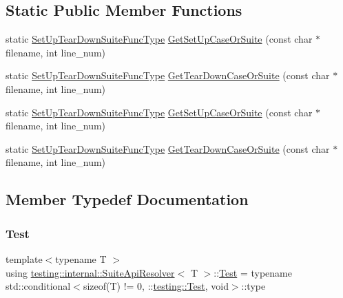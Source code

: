 \subsection*{Static Public Member Functions}
\begin{DoxyCompactItemize}
\item 
static \mbox{\hyperlink{namespacetesting_1_1internal_a754d337f5d643225115fb28f6b1d6fb1}{Set\+Up\+Tear\+Down\+Suite\+Func\+Type}} \mbox{\hyperlink{structtesting_1_1internal_1_1_suite_api_resolver_abae647b1fed9422fc596fd385de6dd5b}{Get\+Set\+Up\+Case\+Or\+Suite}} (const char $\ast$filename, int line\+\_\+num)
\item 
static \mbox{\hyperlink{namespacetesting_1_1internal_a754d337f5d643225115fb28f6b1d6fb1}{Set\+Up\+Tear\+Down\+Suite\+Func\+Type}} \mbox{\hyperlink{structtesting_1_1internal_1_1_suite_api_resolver_a60e647dc7974c2e834812c491cbbca25}{Get\+Tear\+Down\+Case\+Or\+Suite}} (const char $\ast$filename, int line\+\_\+num)
\item 
static \mbox{\hyperlink{namespacetesting_1_1internal_a754d337f5d643225115fb28f6b1d6fb1}{Set\+Up\+Tear\+Down\+Suite\+Func\+Type}} \mbox{\hyperlink{structtesting_1_1internal_1_1_suite_api_resolver_abae647b1fed9422fc596fd385de6dd5b}{Get\+Set\+Up\+Case\+Or\+Suite}} (const char $\ast$filename, int line\+\_\+num)
\item 
static \mbox{\hyperlink{namespacetesting_1_1internal_a754d337f5d643225115fb28f6b1d6fb1}{Set\+Up\+Tear\+Down\+Suite\+Func\+Type}} \mbox{\hyperlink{structtesting_1_1internal_1_1_suite_api_resolver_a60e647dc7974c2e834812c491cbbca25}{Get\+Tear\+Down\+Case\+Or\+Suite}} (const char $\ast$filename, int line\+\_\+num)
\end{DoxyCompactItemize}


\subsection{Member Typedef Documentation}
\mbox{\label{structtesting_1_1internal_1_1_suite_api_resolver_a343c36f492a946d302b1cfc930266768}} 
\subsubsection{\texorpdfstring{Test}{Test}\hspace{0.1cm}{\footnotesize\ttfamily [1/2]}}
{\footnotesize\ttfamily template$<$typename T $>$ \\
using \mbox{\hyperlink{structtesting_1_1internal_1_1_suite_api_resolver}{testing\+::internal\+::\+Suite\+Api\+Resolver}}$<$ T $>$\+::\mbox{\hyperlink{structtesting_1_1internal_1_1_suite_api_resolver_a343c36f492a946d302b1cfc930266768}{Test}} =  typename std\+::conditional$<$sizeof(T) != 0, \+::\mbox{\hyperlink{classtesting_1_1_test}{testing\+::\+Test}}, void$>$\+::type}

